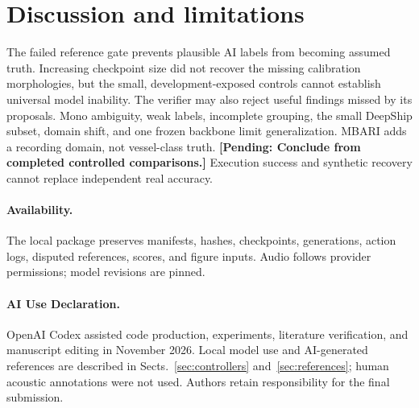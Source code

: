 \documentclass[runningheads,orivec]{llncs}
\newcommand{\pending}[1]{\iffinalresults
  \PackageError{research-results}{Unresolved result or protocol marker}{Resolve the marked item from recorded evidence before submission.}%
  \else\textbf{[Pending: #1]}\fi}
\newif\iffinalresults
\begin{document}
\section{Discussion and limitations}
The failed reference gate prevents plausible AI labels from becoming assumed truth. Increasing checkpoint size did not recover the missing calibration morphologies, but the small, development-exposed controls cannot establish universal model inability. The verifier may also reject useful findings missed by its proposals. Mono ambiguity, weak labels, incomplete grouping, the small DeepShip subset, domain shift, and one frozen backbone limit generalization. MBARI adds a recording domain, not vessel-class truth. \pending{Conclude from completed controlled comparisons.} Execution success and synthetic recovery cannot replace independent real accuracy.

\paragraph{Availability.} The local package preserves manifests, hashes, checkpoints, generations, action logs, disputed references, scores, and figure inputs. Audio follows provider permissions; model revisions are pinned.

\paragraph{AI Use Declaration.} OpenAI Codex assisted code production, experiments, literature verification, and manuscript editing in November 2026. Local model use and AI-generated references are described in Sects.~\ref{sec:controllers} and~\ref{sec:references}; human acoustic annotations were not used. Authors retain responsibility for the final submission.



\end{document}
